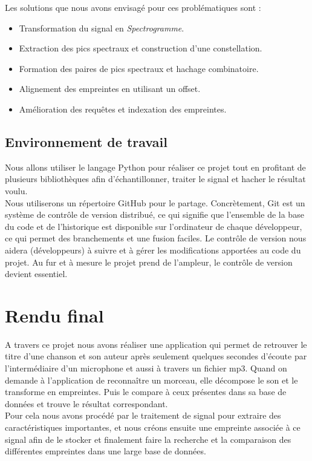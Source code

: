 \documentclass[10pt, report, english]{report}
\begin{document}
Les solutions que nous avons envisagé pour ces problématiques sont :\\

\begin{itemize}
	\item 	Transformation du signal en \textit{Spectrogramme}.
	\item 	Extraction des pics spectraux et construction d'une constellation.
	\item	Formation des paires de pics spectraux et hachage combinatoire.
	\item 	Alignement des empreintes en utilisant un offset.
	\item 	Amélioration des requêtes et indexation des empreintes.
\end{itemize}

\section{Environnement de travail}
Nous allons utiliser le langage Python pour réaliser ce projet tout en profitant de plusieurs bibliothèques afin d'échantillonner, traiter le signal et hacher le résultat voulu.\\

Nous utiliserons un répertoire GitHub pour le partage. Concrètement, Git est un système de contrôle de version distribué, ce qui signifie que l’ensemble de la base du code et de l’historique est disponible sur l’ordinateur de chaque développeur, ce qui permet des branchements et une fusion faciles.
Le contrôle de version nous aidera (développeurs) à suivre et à gérer les modifications apportées au code du projet. Au fur et à mesure le projet prend de l’ampleur, le contrôle de version devient essentiel.\\



\chapter{Rendu final}
\label{rf}
A travers ce projet nous avons réaliser une application qui permet de retrouver le titre d’une chanson et son auteur après seulement quelques secondes d’écoute par l'intermédiaire d'un microphone et aussi à travers un fichier mp3.
Quand on demande à l’application de reconnaître un morceau, elle décompose le son et le transforme en empreintes. Puis le compare à ceux présentes dans sa base de données et trouve le résultat correspondant.\\
Pour cela nous avons procédé par le traitement de signal pour extraire des caractéristiques importantes, et nous créons ensuite une empreinte associée à ce signal afin de le stocker et finalement faire la recherche et la comparaison des différentes empreintes dans une large base de données.
\end{document}
